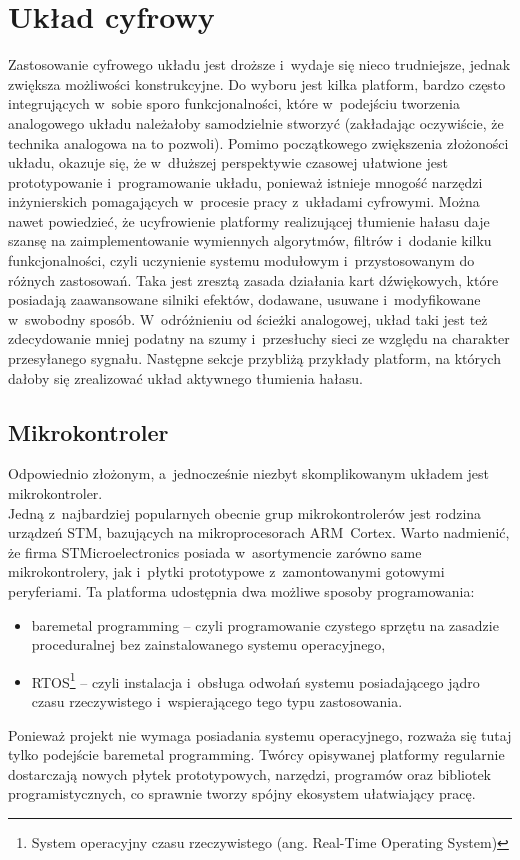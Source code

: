 \section{Układ cyfrowy}
\label{sec:digital}
Zastosowanie cyfrowego układu jest droższe i~wydaje się nieco trudniejsze, jednak zwiększa możliwości konstrukcyjne. Do wyboru jest kilka platform, bardzo często integrujących w~sobie sporo funkcjonalności, które w~podejściu tworzenia analogowego układu należałoby samodzielnie stworzyć (zakładając oczywiście, że technika analogowa na to pozwoli).  Pomimo początkowego zwiększenia złożoności układu, okazuje się, że w~dłuższej perspektywie czasowej ułatwione jest prototypowanie i~programowanie układu, ponieważ istnieje mnogość narzędzi inżynierskich pomagających w~procesie pracy z~układami cyfrowymi. Można nawet powiedzieć, że ucyfrowienie platformy realizującej tłumienie hałasu daje szansę na zaimplementowanie wymiennych algorytmów, filtrów i~dodanie kilku funkcjonalności, czyli uczynienie systemu modułowym i~przystosowanym do różnych zastosowań. Taka jest zresztą zasada działania kart dźwiękowych, które posiadają zaawansowane silniki efektów, dodawane, usuwane i~modyfikowane w~swobodny sposób.  W~odróżnieniu od ścieżki analogowej, układ taki jest też zdecydowanie mniej podatny na szumy i~przesłuchy sieci ze względu na charakter przesyłanego sygnału. Następne sekcje przybliżą przykłady platform, na których dałoby się zrealizować układ aktywnego tłumienia hałasu.
\subsection{Mikrokontroler}
\label{uC}
Odpowiednio złożonym, a~jednocześnie niezbyt skomplikowanym układem jest mikrokontroler.\\
Jedną z~najbardziej popularnych obecnie grup mikrokontrolerów jest rodzina urządzeń STM, bazujących na mikroprocesorach ARM~Cortex. Warto nadmienić, że firma STMicroelectronics posiada w~asortymencie zarówno same mikrokontrolery, jak i~płytki prototypowe z~zamontowanymi gotowymi peryferiami. Ta platforma udostępnia dwa możliwe sposoby programowania:
\begin{itemize}
	\item baremetal programming -- czyli programowanie czystego sprzętu na zasadzie proceduralnej bez zainstalowanego systemu operacyjnego,
	\item RTOS\footnote{System operacyjny czasu rzeczywistego (ang. Real-Time Operating System)} -- czyli instalacja i~obsługa odwołań systemu posiadającego jądro czasu rzeczywistego i~wspierającego tego typu zastosowania.
\end{itemize}
Ponieważ projekt nie wymaga posiadania systemu operacyjnego, rozważa się tutaj tylko podejście baremetal programming. Twórcy opisywanej platformy regularnie dostarczają nowych płytek prototypowych, narzędzi, programów oraz bibliotek programistycznych, co sprawnie tworzy spójny ekosystem ułatwiający pracę.
